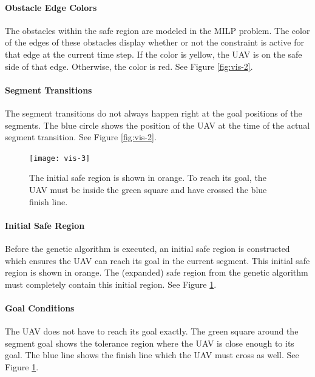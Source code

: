 \paragraph{Obstacle Edge Colors} The obstacles within the safe region are modeled in the MILP problem. The color of the edges of these obstacles display whether or not the constraint is active for that edge at the current time step. If the color is yellow, the UAV is on the safe side of that edge. Otherwise, the color is red. See Figure \ref{fig:vis-2}.
\paragraph{Segment Transitions} The segment transitions do not always happen right at the goal positions of the segments. The blue circle shows the position of the UAV at the time of the actual segment transition. See Figure \ref{fig:vis-2}.
\newpage
\begin{figure}
	\centering
    \texttt{[image: vis-3]}
    \caption[Visualization of the initial safe region and the segment goal conditions]{The initial safe region is shown in orange. To reach its goal, the UAV must be inside the green square and have crossed the blue finish line.}
    \label{fig:vis-3}     
\end{figure}

\paragraph{Initial Safe Region} Before the genetic algorithm is executed, an initial safe region is constructed which ensures the UAV can reach its goal in the current segment. This initial safe region is shown in orange. The (expanded) safe region from the genetic algorithm must completely contain this initial region. See Figure \ref{fig:vis-3}.
\paragraph{Goal Conditions} The UAV does not have to reach its goal exactly. The green square around the segment goal shows the tolerance region where the UAV is close enough to its goal. The blue line shows the finish line which the UAV must cross as well. See Figure \ref{fig:vis-3}.

